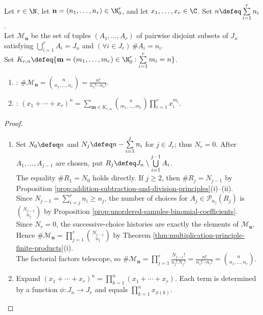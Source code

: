 \begin{proposition} \label{prop:multinomial-coefficient-count-and-expansion} \\
Let $r\in\N$, let $\mathbf{n}=(n_1,\ldots,n_r)\in\N_0^r$, and let $x_1,\ldots,x_r\in\C$. Set $n\defeq\sum\limits_{i=1}^{r}n_i$.\\
Let $\mathcal{M}_{\mathbf{n}}$ be the set of tuples $(A_1,\ldots,A_r)$ of pairwise disjoint subsets of $J_n$ satisfying $\bigcup\limits_{i=1}^{r}A_i=J_n$ and $(\forall i\in J_r)\,\#A_i=n_i$.\\
Set $K_{r,n}\defeq\{\mathbf{m}=(m_1,\ldots,m_r)\in\N_0^r:\sum\limits_{i=1}^{r}m_i=n\}$.
\begin{enumerate}[label=(\roman*)]
\setlength{\itemsep}{0pt}
\item {}: $\#\mathcal{M}_{\mathbf{n}}=\binom{n}{n_1,\ldots,n_r}=\frac{n!}{n_1!\cdots n_r!}$.
\item {}: $(x_1+\cdots+x_r)^n=\sum\limits_{\mathbf{m}\in K_{r,n}}\binom{n}{m_1,\ldots,m_r}\prod\limits_{i=1}^{r}x_i^{m_i}$.
\end{enumerate}
\begin{proof}
\begin{enumerate}[label=(\roman*)]
\setlength{\itemsep}{0pt}
\item Set $N_0\defeq n$ and $N_j\defeq n-\sum\limits_{i=1}^{j}n_i$ for $j\in J_r$; thus $N_r=0$. After $A_1,\ldots,A_{j-1}$ are chosen, put $R_j\defeq J_n\setminus\bigcup\limits_{i=1}^{j-1}A_i$.\\
The equality $\#R_1=N_0$ holds directly. If $j\geq2$, then $\#R_j=N_{j-1}$ by Proposition \ref{prop:addition-subtraction-and-division-principles}(i)--(ii).\\
Since $N_{j-1}=\sum\limits_{i=j}^{r}n_i\geq n_j$, the number of choices for $A_j\in\mathcal{P}_{n_j}(R_j)$ is $\binom{N_{j-1}}{n_j}$ by Proposition \ref{prop:unordered-samples-binomial-coefficients}.\\
Since $N_r=0$, the successive-choice histories are exactly the elements of $\mathcal{M}_{\mathbf{n}}$. Hence $\#\mathcal{M}_{\mathbf{n}}=\prod\limits_{j=1}^{r}\binom{N_{j-1}}{n_j}$ by Theorem \ref{thm:multiplication-principle-finite-products}(i).\\
The factorial factors telescope, so $\#\mathcal{M}_{\mathbf{n}}=\prod\limits_{j=1}^{r}\frac{N_{j-1}!}{n_j!\,N_j!}=\frac{n!}{n_1!\cdots n_r!}=\binom{n}{n_1,\ldots,n_r}$.
\item Expand $(x_1+\cdots+x_r)^n=\prod\limits_{k=1}^{n}(x_1+\cdots+x_r)$. Each term is determined by a function $\phi:J_n\to J_r$ and equals $\prod\limits_{k=1}^{n}x_{\phi(k)}$.\\

\end{enumerate}
\end{proof}
\end{proposition}
